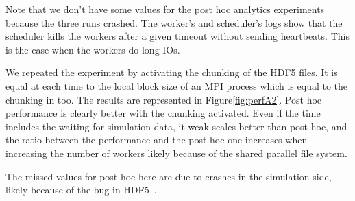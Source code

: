 Note that we don't have some values for the post hoc analytics experiments because the three runs crashed. The worker's and scheduler's logs show that the scheduler kills the workers after a given timeout without sending heartbeats. This is the case when the workers do long IOs. 

We repeated the experiment by activating the chunking of the HDF5 files. It is equal at each time to the local block size of an MPI process which is equal to the chunking in \dask too. 
The results are represented in Figure\ref{fig:perfA2}. Post hoc performance is clearly better with the chunking activated. 
Even if the \deisa time includes the waiting for simulation data, it weak-scales better than post hoc, and the ratio between the \deisa performance and the post hoc one increases when increasing the number of \dask workers likely because of the shared parallel file system. 

The missed values for post hoc here are due to crashes in the simulation side, likely because of the bug in HDF5~\cite{large_2023}.

